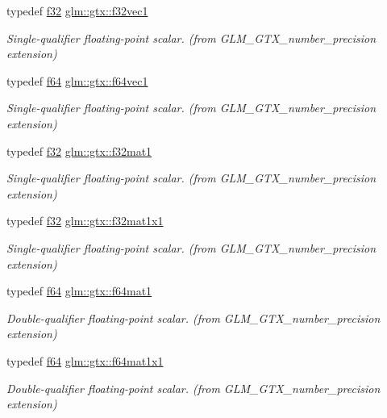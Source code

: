 \begin{DoxyCompactItemize}
typedef \mbox{\hyperlink{group__gtc__type__precision_ga0ec999b57f5330d9021256e96038df04}{f32}} \mbox{\hyperlink{group__gtx__number__precision_gadab8e598b0b4697629482682bdb7f223}{glm\+::gtx\+::f32vec1}}
\begin{DoxyCompactList}\small\item\em Single-\/qualifier floating-\/point scalar. (from G\+L\+M\+\_\+\+G\+T\+X\+\_\+number\+\_\+precision extension) \end{DoxyCompactList}\item 
typedef \mbox{\hyperlink{group__gtc__type__precision_ga2bba392e555124b36cde6abba349bab3}{f64}} \mbox{\hyperlink{group__gtx__number__precision_ga44336a26c958d66efdfb5a6c114c538e}{glm\+::gtx\+::f64vec1}}
\begin{DoxyCompactList}\small\item\em Single-\/qualifier floating-\/point scalar. (from G\+L\+M\+\_\+\+G\+T\+X\+\_\+number\+\_\+precision extension) \end{DoxyCompactList}\item 
typedef \mbox{\hyperlink{group__gtc__type__precision_ga0ec999b57f5330d9021256e96038df04}{f32}} \mbox{\hyperlink{group__gtx__number__precision_gae5ff376ec910c360f06acc0c2b99260c}{glm\+::gtx\+::f32mat1}}
\begin{DoxyCompactList}\small\item\em Single-\/qualifier floating-\/point scalar. (from G\+L\+M\+\_\+\+G\+T\+X\+\_\+number\+\_\+precision extension) \end{DoxyCompactList}\item 
typedef \mbox{\hyperlink{group__gtc__type__precision_ga0ec999b57f5330d9021256e96038df04}{f32}} \mbox{\hyperlink{group__gtx__number__precision_ga01caec78388a82a9a22bd45e5751a38a}{glm\+::gtx\+::f32mat1x1}}
\begin{DoxyCompactList}\small\item\em Single-\/qualifier floating-\/point scalar. (from G\+L\+M\+\_\+\+G\+T\+X\+\_\+number\+\_\+precision extension) \end{DoxyCompactList}\item 
typedef \mbox{\hyperlink{group__gtc__type__precision_ga2bba392e555124b36cde6abba349bab3}{f64}} \mbox{\hyperlink{group__gtx__number__precision_ga23f8f53c78b50aa07a113c3d07d01bc9}{glm\+::gtx\+::f64mat1}}
\begin{DoxyCompactList}\small\item\em Double-\/qualifier floating-\/point scalar. (from G\+L\+M\+\_\+\+G\+T\+X\+\_\+number\+\_\+precision extension) \end{DoxyCompactList}\item 
typedef \mbox{\hyperlink{group__gtc__type__precision_ga2bba392e555124b36cde6abba349bab3}{f64}} \mbox{\hyperlink{group__gtx__number__precision_ga710a5952d78b22635c71c5fc2c0a3319}{glm\+::gtx\+::f64mat1x1}}
\begin{DoxyCompactList}\small\item\em Double-\/qualifier floating-\/point scalar. (from G\+L\+M\+\_\+\+G\+T\+X\+\_\+number\+\_\+precision extension) \end{DoxyCompactList}\end{DoxyCompactItemize}


